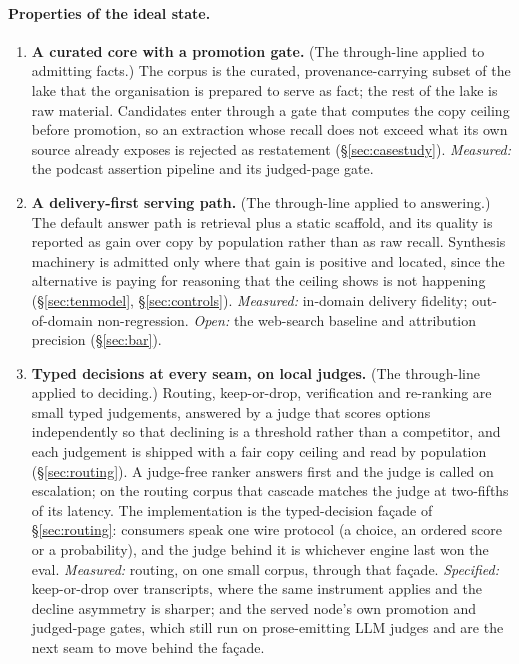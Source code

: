 \paragraph{Properties of the ideal state.}
\begin{enumerate}[topsep=2pt,itemsep=3pt,leftmargin=2em,label=\textbf{D\arabic*}]
\item \textbf{A curated core with a promotion gate.} (The through-line applied to admitting facts.) The corpus is the curated, provenance-carrying subset of the lake that the organisation is prepared to serve as fact; the rest of the lake is raw material. Candidates enter through a gate that computes the copy ceiling before promotion, so an extraction whose recall does not exceed what its own source already exposes is rejected as restatement (\S\ref{sec:casestudy}). \emph{Measured:} the podcast assertion pipeline and its judged-page gate.
\item \textbf{A delivery-first serving path.} (The through-line applied to answering.) The default answer path is retrieval plus a static scaffold, and its quality is reported as gain over copy by population rather than as raw recall. Synthesis machinery is admitted only where that gain is positive and located, since the alternative is paying for reasoning that the ceiling shows is not happening (\S\ref{sec:tenmodel}, \S\ref{sec:controls}). \emph{Measured:} in-domain delivery fidelity; out-of-domain non-regression. \emph{Open:} the web-search baseline and attribution precision (\S\ref{sec:bar}).
\item \textbf{Typed decisions at every seam, on local judges.} (The through-line applied to deciding.) Routing, keep-or-drop, verification and re-ranking are small typed judgements, answered by a judge that scores options independently so that declining is a threshold rather than a competitor, and each judgement is shipped with a fair copy ceiling and read by population (\S\ref{sec:routing}). A judge-free ranker answers first and the judge is called on escalation; on the routing corpus that cascade matches the judge at two-fifths of its latency. The implementation is the typed-decision façade of \S\ref{sec:routing}: consumers speak one wire protocol (a choice, an ordered score or a probability), and the judge behind it is whichever engine last won the eval. \emph{Measured:} routing, on one small corpus, through that façade. \emph{Specified:} keep-or-drop over transcripts, where the same instrument applies and the decline asymmetry is sharper; and the served node's own promotion and judged-page gates, which still run on prose-emitting LLM judges and are the next seam to move behind the façade.

\end{enumerate}
